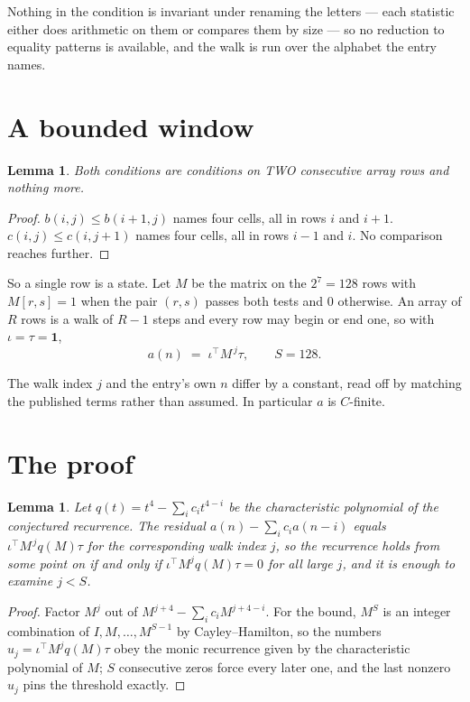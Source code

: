 \documentclass[11pt,a4paper]{article}
\theoremstyle{plain}
\newtheorem{lemma}[theorem]{Lemma}
\theoremstyle{definition}
\begin{document}
Nothing in the condition is invariant under renaming the letters --- each statistic either does
arithmetic on them or compares them by size --- so no reduction to equality patterns is
available, and the walk is run over the alphabet the entry names.

\section{A bounded window}

\begin{lemma}\label{lem:win}
Both conditions are conditions on TWO consecutive array rows and nothing more.
\end{lemma}

\begin{proof}
$b(i,j)\le b(i{+}1,j)$ names four cells, all in rows $i$ and $i+1$. $c(i,j)\le c(i,j{+}1)$
names four cells, all in rows $i-1$ and $i$. No comparison reaches further.
\end{proof}

So a single row is a state. Let $M$ be the matrix on the $2^{7}=128$ rows with
$M[r,s]=1$ when the pair $(r,s)$ passes both tests and $0$ otherwise. An array of $R$ rows is a
walk of $R-1$ steps and every row may begin or end one, so with $\iota=\tau=\mathbf{1}$,
\[
a(n)\;=\;\iota^{\!\top}M^{\,j}\tau ,\qquad S=128.
\]

The walk index $j$ and the entry's own $n$ differ by a constant, read off by matching the
published terms rather than assumed. In particular $a$ is $C$-finite.

\section{The proof}

\begin{lemma}\label{lem:crit}
Let $q(t)=t^{4}-\sum_i c_it^{4-i}$ be the characteristic polynomial of the
conjectured recurrence. The residual $a(n)-\sum_ic_ia(n-i)$ equals
$\iota^{\!\top}M^{\,j}q(M)\tau$ for the corresponding walk index $j$, so the recurrence
holds from some point on if and only if $\iota^{\!\top}M^{j}q(M)\tau=0$ for all large $j$,
and it is enough to examine $j<S$.
\end{lemma}

\begin{proof}
Factor $M^{j}$ out of $M^{j+4}-\sum_ic_iM^{j+4-i}$. For the bound, $M^{S}$
is an integer combination of $I,M,\dots,M^{S-1}$ by Cayley--Hamilton, so the numbers
$u_j=\iota^{\!\top}M^{j}q(M)\tau$ obey the monic recurrence given by the characteristic
polynomial of $M$; $S$ consecutive zeros force every later one, and the last nonzero $u_j$
pins the threshold exactly.
\end{proof}
\end{document}
